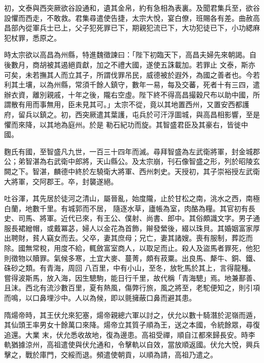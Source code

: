 \begin{pinyinscope}
 初，文泰與西突厥欲谷設通和，遺其金帛，約有急相為表裏。及聞君集兵至，欲谷設懼而西走，不敢救。君集尋遣使告捷，太宗大悅，宴白僚，班賜各有差。曲赦高昌部內從軍兵士已上，父子犯死罪已下，期親犯流已下，大功犯徒已下，小功緦麻犯杖罪，悉原之。



 時太宗欲以高昌為州縣，特進魏徵諫曰：「陛下初臨天下，高昌夫婦先來朝謁。自後數月，商胡被其遏絕貢獻，加之不禮大國，遂使五誅載加。若罪止
 文泰，斯亦可矣，未若撫其人而立其子，所謂伐罪吊民，威德被於遐外，為國之善者也。今若利其土壤，以為州縣，常須千餘人鎮守，數年一易，每及交蕃，死者十有三四，遣辦衣資，離別親戚，十年之後，隴右空虛。陛下終不得高昌撮穀尺布以助中國，所謂散有用而事無用，臣未見其可。」太宗不從，竟以其地置西州，又置安西都護府，留兵以鎮之。初，西突厥遣其葉護，屯兵於可汗浮圖城，與高昌相影響，至是懼而來降，以其地為庭州。於是
 勒石紀功而旋。其智盛君臣及其豪右，皆徙中國。



 麴氏有國，至智盛凡九世，一百三十四年而滅。尋拜智盛為左武衛將軍，封金城郡公；弟智湛為右武衛中郎將，天山縣公。及太宗崩，刊石像智盛之形，列於昭陵玄闕之下。智湛，麟德中終於左驍衛大將軍、西州刺史。天授初，其子崇裕授左武衛大將軍，交阿郡王。卒，封襲遂絕。



 吐谷渾，其先居於徒河之清山，屬晉亂，始度隴，止於甘松之南，洮水之西，南極白蘭，地數千里。有城郭而不居，
 隨逐水草，廬帳為室，肉酪為糧。其官初有長史、司馬、將軍。近代已來，有王公、僕射、尚書、郎中。其俗頗識文字。男子通服長裙繒帽，或戴冪苾，婦人以金花為首飾，辮發縈後，綴以珠貝。其婚姻富家厚出聘財，貧人竊女而去。父卒，妻其庶母；兄亡，妻其諸嫂。喪有服制，葬訖而除。國無常稅，用度不給，輒斂富室商人，以取足而止。殺人及盜馬者罪死，他犯則徵物以贖罪。氣候多寒，土宜大麥、蔓菁，頗有菽粟。出良馬、犛牛、銅、鐵、硃砂之類。有青海，周回
 八百里，中有小山，至冬，放牝馬於其上，言得龍種。嘗得波斯馬，放入海，因生驄駒，能日行千里，故代稱「青海驄」焉。地兼鄯善、且沫。西北有流沙數百里，夏有熱風，傷弊行旅，風之將至，老駝便知之，則引項而鳴，以口鼻埋沙中。人以為候，即以氈擁蔽口鼻而避其患。



 隋煬帝時，其王伏允來犯塞，煬帝親總六軍以討之，伏允以數十騎潛於泥嶺而遁，其仙頭王率男女十餘萬口來降。煬帝立其質子順為王，送之本國，令統餘眾，尋復追還。大業
 末，伏允悉收故地，復為邊患。高祖受禪，順自江都來歸長安。時李軌猶據涼州，高祖遣使與伏允通和，令擊軌以自效，當放順返國。伏允大悅，興兵擊之，戰於庫門，交綏而退。頻遣使朝貢，以順為請，高祖乃遣之。




\end{pinyinscope}
